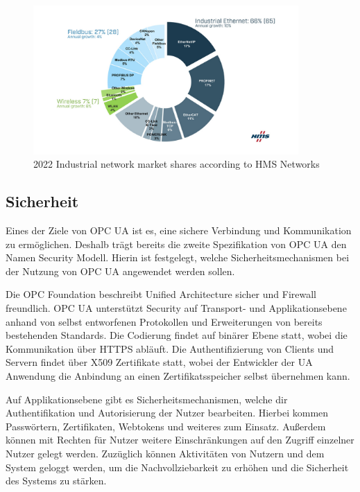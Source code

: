\documentclass[a4paper, 12pt, oneside]{scrbook}
\begin{document}
		
		
		
		\begin{figure}[H]
			\centering
			\includegraphics[width=0.9\textwidth]{res/network-shares.png}
			\caption{2022 Industrial network market shares according to HMS Networks \cite{noauthor_2022_nodate}} 
			\label{fig:share}
		\end{figure}
		
		\subsection{Sicherheit}
		
		
		Eines der Ziele von OPC UA ist es, eine sichere Verbindung und Kommunikation zu ermöglichen. Deshalb trägt bereits die zweite Spezifikation von OPC UA den Namen 
		\glqq Security Modell\grqq. Hierin ist festgelegt, welche Sicherheitsmechanismen bei der Nutzung von OPC UA angewendet werden sollen.
		
		Die OPC Foundation beschreibt Unified Architecture sicher und Firewall freundlich. OPC UA unterstützt Security auf Transport- und Applikationsebene anhand von selbst entworfenen Protokollen und Erweiterungen von bereits bestehenden Standards. Die Codierung findet auf binärer Ebene statt, wobei die Kommunikation über HTTPS abläuft. Die Authentifizierung von Clients und Servern findet über X509 Zertifikate statt, wobei der Entwickler der UA Anwendung die Anbindung an einen Zertifikatsspeicher selbst übernehmen kann. \cite{noauthor_unified_nodate, noauthor_opc_nodate}
		
		Auf Applikationsebene gibt es Sicherheitsmechanismen, welche dir Authentifikation und Autorisierung der Nutzer bearbeiten. Hierbei kommen Passwörtern, Zertifikaten, Webtokens und weiteres zum Einsatz. Außerdem können mit Rechten für Nutzer weitere Einschränkungen auf den Zugriff einzelner Nutzer gelegt werden. Zuzüglich können Aktivitäten von Nutzern und dem System geloggt werden, um die Nachvollziebarkeit zu erhöhen und die Sicherheit des Systems zu stärken. \cite{noauthor_unified_nodate, noauthor_opc_nodate}
		
\end{document}
